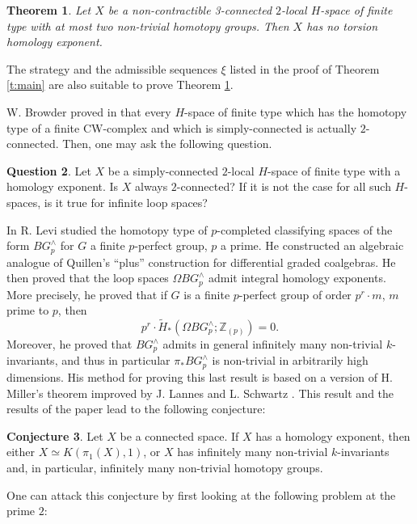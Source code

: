 \documentclass{conm-p-l}
\newtheorem{thm}{Theorem}[section]
\theoremstyle{definition}
\newtheorem{conj}[thm]{Conjecture}
\newtheorem{quest}[thm]{Question}
\newcommand{\Z}{\mathbb{Z}}
\begin{document}
\begin{thm}\label{t:main2}
Let $X$ be a non-contractible 3-connected $2$-local ${H}$-space of \mbox{finite} type with at most two non-trivial homotopy groups. Then $X$ has no torsion homology exponent.
\end{thm}

The strategy and the admissible sequences $\xi$ listed in the proof of Theorem \ref{t:main} are also suitable to prove Theorem \ref{t:main2}.

\bigskip
W. Browder proved in \cite[Theorem 6.11, p. 46]{Br61} that every ${H}$-space of finite type which has the homotopy type of a finite CW-complex and which is simply-connected is actually $2$-connected. Then, one may ask the following question.

\begin{quest}
Let $X$ be a simply-connected $2$-local ${H}$-space of finite type with a homology exponent. Is $X$ always $2$-connected? If it is not the case for all such ${H}$-spaces, is it true for infinite loop spaces?
\end{quest}

\bigskip
In \cite{Le95} R. Levi studied the homotopy type of $p$-completed classifying spaces of the form $BG^\wedge_p$ for $G$ a finite $p$-perfect group, $p$ a prime. He constructed an algebraic analogue of Quillen's ``plus'' construction for differential graded coalgebras. He then proved that the loop spaces $\Omega BG^\wedge_p$ admit integral homology exponents. More precisely, he proved that if $G$ is a finite $p$-perfect group of order $p^r\cdot m$, $m$ prime to $p$, then
$$
p^r\cdot\widetilde{H}_*(\Omega BG^\wedge_p;\Z_{(p)})=0.
$$
Moreover, he proved that $BG^\wedge_p$ admits in general infinitely many non-trivial $k$-invariants, and thus in particular $\pi_*BG^\wedge_p$ is non-trivial in arbitrarily high dimensions. His method for proving this last result is based on a version of H. Miller's theorem improved by J. Lannes and L. Schwartz \cite{LS86}. This result and the results of the paper lead to the following conjecture:

\begin{conj}\label{conj:conj}
Let $X$ be a connected space. If $X$ has a homology exponent, then either $X\simeq K(\pi_1(X),1)$, or $X$ has infinitely many non-trivial $k$-invariants and, in particular, infinitely many non-trivial homotopy groups. 
\end{conj}

One can attack this conjecture by first looking at the following problem at the prime $2$:
\end{document}
